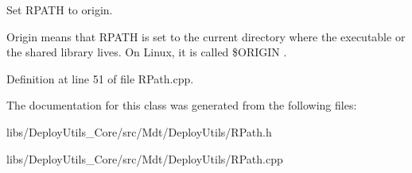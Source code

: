 Set R\+P\+A\+TH to origin. 

Origin means that R\+P\+A\+TH is set to the current directory where the executable or the shared library lives. On Linux, it is called \$\+O\+R\+I\+G\+IN . 

Definition at line 51 of file R\+Path.\+cpp.



The documentation for this class was generated from the following files\+:\begin{DoxyCompactItemize}
\item 
libs/\+Deploy\+Utils\+\_\+\+Core/src/\+Mdt/\+Deploy\+Utils/R\+Path.\+h\item 
libs/\+Deploy\+Utils\+\_\+\+Core/src/\+Mdt/\+Deploy\+Utils/R\+Path.\+cpp\end{DoxyCompactItemize}
